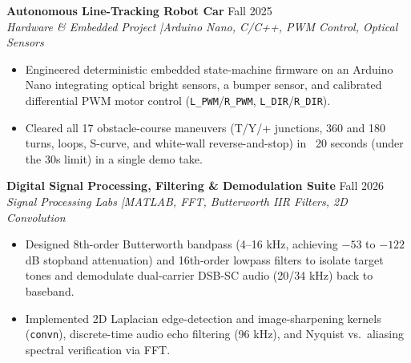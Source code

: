 \documentclass[10pt,a4paper]{article}
\begin{document}
\textbf{Autonomous Line-Tracking Robot Car} \hfill Fall 2025\\
\textit{Hardware \& Embedded Project \enspace|\enspace Arduino Nano, C/C++, PWM Control, Optical Sensors}
\begin{itemize}
  \item Engineered deterministic embedded state-machine firmware on an Arduino Nano integrating optical bright sensors, a bumper sensor, and calibrated differential PWM motor control (\texttt{L\_PWM}/\texttt{R\_PWM}, \texttt{L\_DIR}/\texttt{R\_DIR}).
  \item Cleared all 17 obstacle-course maneuvers (T/Y/+ junctions, 360\textdegree{} and 180\textdegree{} turns, loops, S-curve, and white-wall reverse-and-stop) in ~20 seconds (under the 30s limit) in a single demo take.
\end{itemize}
\vspace{3pt}

\textbf{Digital Signal Processing, Filtering \& Demodulation Suite} \hfill Fall 2026\\
\textit{Signal Processing Labs \enspace|\enspace MATLAB, FFT, Butterworth IIR Filters, 2D Convolution}
\begin{itemize}
  \item Designed 8th-order Butterworth bandpass (4--16 kHz, achieving $-53$ to $-122$ dB stopband attenuation) and 16th-order lowpass filters to isolate target tones and demodulate dual-carrier DSB-SC audio (20/34 kHz) back to baseband.
  \item Implemented 2D Laplacian edge-detection and image-sharpening kernels (\texttt{convn}), discrete-time audio echo filtering (96 kHz), and Nyquist vs.\ aliasing spectral verification via FFT.
\end{itemize}

\end{document}
